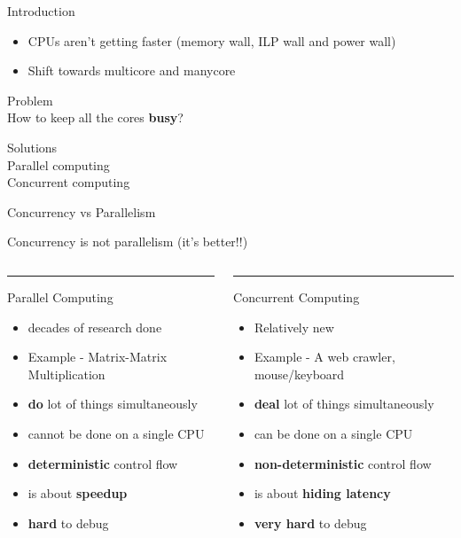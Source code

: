 \ifdefined\LONG
\begin{frame}{Introduction}
\begin{itemize}
\item \small CPUs aren't getting faster (memory wall, ILP wall and power wall)
\item \small Shift towards multicore and manycore
\end{itemize}
\begin{center}
\Large {\color{red} Problem}\\
How to keep all the cores \textbf{busy}?
\end{center}
\pause
\begin{center}
\Large {\color{blue} Solutions}\\
Parallel computing \\ %
\pause
Concurrent computing %
\end{center}
\end{frame}

\begin{frame}{Concurrency vs Parallelism}
\begin{center}
\Large {\color{blue}Concurrency} is not {\color{red}parallelism} (it's better!!)
\end{center}
\pause
\begin{columns}
\begin{column}[t]{0.48\textwidth}
\color{red}\rule{\linewidth}{4pt}
Parallel Computing
\begin{itemize}
\item decades of research done
\item Example - Matrix-Matrix Multiplication
\item \textbf{do} lot of things simultaneously
\item cannot be done on a single CPU
\item \textbf{deterministic} control flow
\item is about \textbf{speedup}
\item \textbf{hard} to debug
\end{itemize}
\end{column}
\begin{column}[t]{0.48\textwidth}
\color{blue}\rule{\linewidth}{4pt}
Concurrent Computing
\begin{itemize}
\item Relatively new
\item Example - A web crawler, mouse/keyboard
\item \textbf{deal} lot of things simultaneously
\item can be done on a single CPU
\item \textbf{non-deterministic} control flow
\item is about \textbf{hiding latency}
\item \textbf{very hard} to debug
\end{itemize}
\end{column}
\end{columns}
\end{frame}

